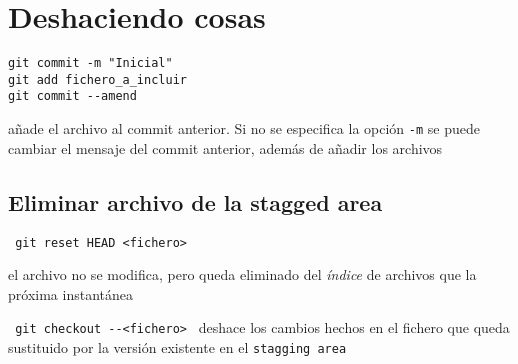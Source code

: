 \documentclass[]{article}
\begin{document}
\section{Deshaciendo cosas}

\begin{verbatim}
git commit -m "Inicial"
git add fichero_a_incluir
git commit --amend
\end{verbatim}

añade el archivo al commit anterior. Si no se especifica la opción \texttt{-m} se puede cambiar el mensaje del commit anterior, además de añadir los archivos

\subsection*{Eliminar archivo de la stagged area}

\verb= git reset HEAD <fichero> =

el archivo no se modifica, pero queda eliminado del \textit{índice} de archivos que la próxima instantánea

\verb= git checkout --<fichero> = deshace los cambios hechos en el fichero que queda sustituido por la versión existente en el \texttt{stagging area}
\end{document}
